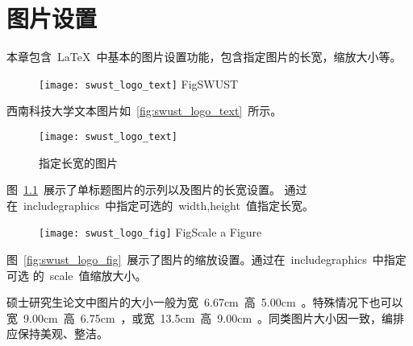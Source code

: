 \chapter{图片设置}

本章包含~\LaTeX~中基本的图片设置功能，包含指定图片的长宽，缩放大小等。

\begin{figure}[ht]
  \centering
  \texttt{[image: swust\_logo\_text]}
            {Fig}{SWUST}
\end{figure}
西南科技大学文本图片如~\ref{fig:swust_logo_text}~所示。

\begin{figure}[ht]
  \centering
  \texttt{[image: swust\_logo\_text]}
  \caption{指定长宽的图片}\label{fig:swust_logo_text1}
\end{figure}
图~\ref{fig:swust_logo_text1}~展示了单标题图片的示列以及图片的长宽设置。
通过在~includegraphics~中指定可选的~width,height~值指定长宽。

\begin{figure}[ht]
  \centering
  \texttt{[image: swust\_logo\_fig]}
            {Fig}{Scale a Figure}
\end{figure}

图~\ref{fig:swust_logo_fig}~展示了图片的缩放设置。通过在~includegraphics~中指定可选
的~scale~值缩放大小。

硕士研究生论文中图片的大小一般为宽~6.67cm~高~5.00cm~。特殊情况下也可以
宽~9.00cm~高~6.75cm~，或宽~13.5cm~高~9.00cm~。同类图片大小因一致，编排
应保持美观、整洁。
